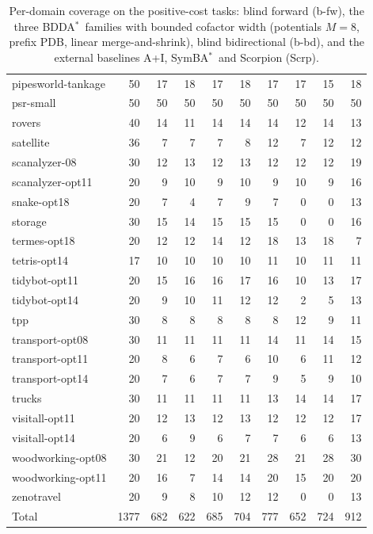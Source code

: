 \documentclass[letterpaper]{article}
\newcommand{\bddastar}{BDDA\ensuremath{^{*}}}
\newcommand{\symba}{SymBA\ensuremath{^{*}}}
\theoremstyle{plain}
\theoremstyle{definition}
\theoremstyle{remark}
\begin{document}
\begin{table}[p]
\begin{tabular}{lrrrrrrrrr}
pipesworld-tankage & 50 & 17 & 18 & 17 & 18 & 17 & 17 & 15 & 18 \\
psr-small & 50 & 50 & 50 & 50 & 50 & 50 & 50 & 50 & 50 \\
rovers & 40 & 14 & 11 & 14 & 14 & 14 & 12 & 14 & 13 \\
satellite & 36 & 7 & 7 & 7 & 8 & 12 & 7 & 12 & 12 \\
scanalyzer-08 & 30 & 12 & 13 & 12 & 13 & 12 & 12 & 12 & 19 \\
scanalyzer-opt11 & 20 & 9 & 10 & 9 & 10 & 9 & 10 & 9 & 16 \\
snake-opt18 & 20 & 7 & 4 & 7 & 9 & 7 & 0 & 0 & 13 \\
storage & 30 & 15 & 14 & 15 & 15 & 15 & 0 & 0 & 16 \\
termes-opt18 & 20 & 12 & 12 & 14 & 12 & 18 & 13 & 18 & 7 \\
tetris-opt14 & 17 & 10 & 10 & 10 & 10 & 11 & 10 & 11 & 11 \\
tidybot-opt11 & 20 & 15 & 16 & 16 & 17 & 16 & 10 & 13 & 17 \\
tidybot-opt14 & 20 & 9 & 10 & 11 & 12 & 12 & 2 & 5 & 13 \\
tpp & 30 & 8 & 8 & 8 & 8 & 8 & 12 & 9 & 11 \\
transport-opt08 & 30 & 11 & 11 & 11 & 11 & 14 & 11 & 14 & 15 \\
transport-opt11 & 20 & 8 & 6 & 7 & 6 & 10 & 6 & 11 & 12 \\
transport-opt14 & 20 & 7 & 6 & 7 & 7 & 9 & 5 & 9 & 10 \\
trucks & 30 & 11 & 11 & 11 & 11 & 13 & 14 & 14 & 17 \\
visitall-opt11 & 20 & 12 & 13 & 12 & 13 & 12 & 12 & 12 & 17 \\
visitall-opt14 & 20 & 6 & 9 & 6 & 7 & 7 & 6 & 6 & 13 \\
woodworking-opt08 & 30 & 21 & 12 & 20 & 21 & 28 & 21 & 28 & 30 \\
woodworking-opt11 & 20 & 16 & 7 & 14 & 14 & 20 & 15 & 20 & 20 \\
zenotravel & 20 & 9 & 8 & 10 & 12 & 12 & 0 & 0 & 13 \\
\midrule
Total & 1377 & 682 & 622 & 685 & 704 & 777 & 652 & 724 & 912 \\
\bottomrule
\end{tabular}
\caption{Per-domain coverage on the positive-cost tasks: blind forward
(b-fw), the three \bddastar\ families with bounded cofactor width
(potentials $M=8$, prefix PDB, linear merge-and-shrink), blind
bidirectional (b-bd), and the external baselines A+I, \symba\ and
Scorpion (Scrp).}
\label{tab-domains}
\end{table}
\end{document}
